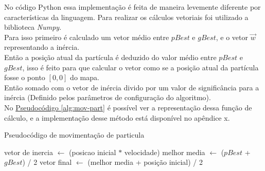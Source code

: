 No código Python essa implementação é feita de maneira levemente diferente por características da linguagem. Para realizar os cálculos vetoriais foi utilizado a biblioteca \textit{Numpy}.\\
\indent Para isso primeiro é calculado um vetor médio entre $pBest$ e $gBest$, e o vetor $\vec w$ representando a inércia.\\
\indent Então a posição atual da partícula é deduzido do valor médio entre $pBest$ e $gBest$, isso é feito para que calcular o vetor como se a posição atual da partícula fosse o ponto $[0,0]$ do mapa.\\
Então somado com o vetor de inércia divido por um valor de significância para a inércia (Definido pelos parâmetros de configuração do algoritmo).\\
%
\indent No \hyperref[alg:mov-part]{Pseudocódigo \ref{alg:mov-part}} é possível ver a representação dessa função de cálculo, e a implementação desse método está disponível no apêndice x.
\begin{algorithm}
    \caption{Pseudocódigo de movimentação de particula}\label{alg:mov-part}
\begin{algorithmic}
\State vetor de inercia $\gets$ (posicao inicial $*$ velocidade)
\State melhor media $\gets$ ($pBest$ + $gBest$) / 2
\State vetor final $\gets$ (melhor media + posição inicial) / 2
\end{algorithmic}
\end{algorithm}
